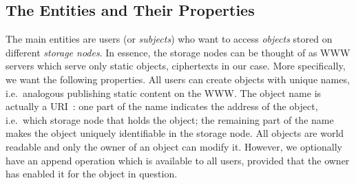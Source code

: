 \subsection{The Entities and Their Properties}\label{sec:EntitiesProperties}


The main entities are users (or \emph{subjects}) who want to access 
\emph{objects} stored on different \emph{storage nodes}.
In essence, the storage nodes can be thought of as \ac{WWW} servers which serve 
only static objects, ciphertexts in our case.
More specifically, we want the following properties.
All users can create objects with unique names, i.e.\ analogous publishing 
static content on the \ac{WWW}.
The object name is actually a \ac{URI}~\cite{rfc3986}:
one part of the name indicates the address of the object, i.e.\ which storage 
node that holds the object;
the remaining part of the name makes the object uniquely identifiable in the 
storage node.
All objects are world readable and only the owner of an object can modify it.
However, we optionally have an append operation which is available to all 
users, provided that the owner has enabled it for the object in question.


